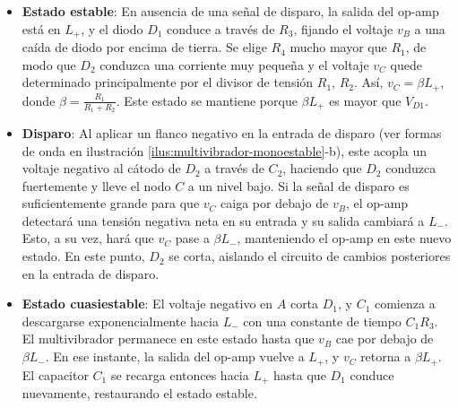 \begin{itemize}
    \item \textbf{Estado estable}: En ausencia de una señal de disparo, la salida del op-amp está en \( L_+ \), y el diodo \( D_1 \) conduce a través de \( R_3 \), fijando el voltaje \( v_B \) a una caída de diodo por encima de tierra. Se elige \( R_4 \) mucho mayor que \( R_1 \), de modo que \( D_2 \) conduzca una corriente muy pequeña y el voltaje \( v_C \) quede determinado principalmente por el divisor de tensión \( R_1 \), \( R_2 \). Así, \( v_C = \beta L_+ \), donde \( \beta = \frac{R_1}{R_1 + R_2} \). Este estado se mantiene porque \( \beta L_+ \) es mayor que \( V_{D1} \).

    \item \textbf{Disparo}: Al aplicar un flanco negativo en la entrada de disparo (ver formas de onda en ilustración \ref{ilus:multivibrador-monoestable}-b), este acopla un voltaje negativo al cátodo de \( D_2 \) a través de \( C_2 \), haciendo que \( D_2 \) conduzca fuertemente y lleve el nodo \( C \) a un nivel bajo. Si la señal de disparo es suficientemente grande para que \( v_C \) caiga por debajo de \( v_B \), el op-amp detectará una tensión negativa neta en su entrada y su salida cambiará a \( L_- \). Esto, a su vez, hará que \( v_C \) pase a \( \beta L_- \), manteniendo el op-amp en este nuevo estado. En este punto, \( D_2 \) se corta, aislando el circuito de cambios posteriores en la entrada de disparo.

    \item \textbf{Estado cuasiestable}: El voltaje negativo en \( A \) corta \( D_1 \), y \( C_1 \) comienza a descargarse exponencialmente hacia \( L_- \) con una constante de tiempo \( C_1 R_3 \). El multivibrador permanece en este estado hasta que \( v_B \) cae por debajo de \( \beta L_- \). En ese instante, la salida del op-amp vuelve a \( L_+ \), y \( v_C \) retorna a \( \beta L_+ \). El capacitor \( C_1 \) se recarga entonces hacia \( L_+ \) hasta que \( D_1 \) conduce nuevamente, restaurando el estado estable.
\end{itemize}